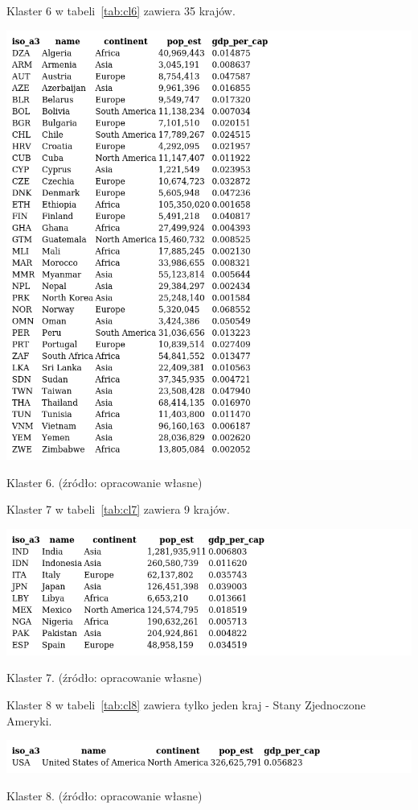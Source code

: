 \documentclass[11pt]{report}
\begin{document}
    Klaster 6 w tabeli~\ref{tab:cl6} zawiera 35 krajów.
    \begin{table}[!htp]
        \centering
        \includegraphics[width=\linewidth]{tables/CLUST/clust6kmeans.png}
        \caption{Klaster 6. (źródło: opracowanie własne)}
        \label{tab:cl6}
    \end{table}

    Klaster 7 w tabeli~\ref{tab:cl7} zawiera 9 krajów.
    \begin{table}[!htp]
        \centering
        \includegraphics[width=\linewidth]{tables/CLUST/clust7kmeans.png}
        \caption{Klaster 7. (źródło: opracowanie własne)}
        \label{tab:cl7}
    \end{table}

    Klaster 8 w tabeli~\ref{tab:cl8} zawiera tylko jeden kraj - Stany Zjednoczone Ameryki.
    \begin{table}[!htp]
        \centering
        \includegraphics[width=\linewidth]{tables/CLUST/clust8kmeans.png}
        \caption{Klaster 8. (źródło: opracowanie własne)}
        \label{tab:cl8}
    \end{table}
\end{document}
